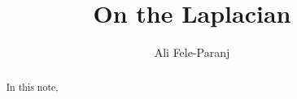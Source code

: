 \documentclass[10pt,a4paper,twocolumn]{article}
\title{On the Laplacian}
\author{Ali Fele-Paranj}
\begin{document}
	\maketitle
	\begin{abstract}
		In this note,
	\end{abstract}
	\newpage
	
\end{document}
